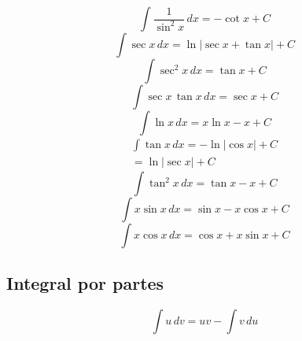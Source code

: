 \documentclass[a4paper,12pt,numbers=noenddot]{scrreprt}
\begin{document}
\begin{multicols}{2}
\begin{equation*}
            \int \frac{1}{\sin^2 x} \, dx = -\cot x + C
        \end{equation*}
        \begin{equation*}
            \int \sec x \, dx = \ln |\sec x + \tan x| + C
        \end{equation*}
        \begin{equation*}
            \int \sec^2 x \, dx = \tan x + C
        \end{equation*}
        \begin{equation*}
            \int \sec x \, \tan x \, dx = \sec x + C
        \end{equation*}
        \begin{equation*}
            \int \ln x \, dx = x \ln x - x + C
        \end{equation*}
        \begin{align*}
        \int \tan x \, dx = -\ln |\cos x| + C\\=\ln |\sec x| + C
        \end{align*}
        \begin{equation*}
        \int \tan^2 x \, dx = \tan x - x + C   
        \end{equation*}
        \begin{equation*}
        \int x \sin x \, dx = \sin x - x \cos x + C
        \end{equation*}
        \begin{equation*}
        \int x \cos x \, dx = \cos x + x \sin x + C
        \end{equation*}

    \end{multicols}

    \subsection*{Integral por partes}
        \begin{equation*}
            \int u \, dv = uv - \int v \, du
        \end{equation*}
\end{document}

